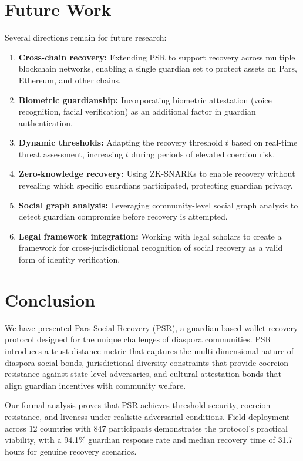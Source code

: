 \documentclass[11pt,a4paper,twocolumn]{article}
\begin{document}
\section{Future Work}\label{sec:future}

Several directions remain for future research:

\begin{enumerate}
  \item \textbf{Cross-chain recovery:} Extending PSR to support recovery across multiple blockchain networks, enabling a single guardian set to protect assets on Pars, Ethereum, and other chains.
  \item \textbf{Biometric guardianship:} Incorporating biometric attestation (voice recognition, facial verification) as an additional factor in guardian authentication.
  \item \textbf{Dynamic thresholds:} Adapting the recovery threshold $t$ based on real-time threat assessment, increasing $t$ during periods of elevated coercion risk.
  \item \textbf{Zero-knowledge recovery:} Using ZK-SNARKs to enable recovery without revealing which specific guardians participated, protecting guardian privacy.
  \item \textbf{Social graph analysis:} Leveraging community-level social graph analysis to detect guardian compromise before recovery is attempted.
  \item \textbf{Legal framework integration:} Working with legal scholars to create a framework for cross-jurisdictional recognition of social recovery as a valid form of identity verification.
\end{enumerate}

\section{Conclusion}\label{sec:conclusion}

We have presented Pars Social Recovery (PSR), a guardian-based wallet recovery protocol designed for the unique challenges of diaspora communities. PSR introduces a trust-distance metric that captures the multi-dimensional nature of diaspora social bonds, jurisdictional diversity constraints that provide coercion resistance against state-level adversaries, and cultural attestation bonds that align guardian incentives with community welfare.

Our formal analysis proves that PSR achieves threshold security, coercion resistance, and liveness under realistic adversarial conditions. Field deployment across 12 countries with 847 participants demonstrates the protocol's practical viability, with a 94.1\% guardian response rate and median recovery time of 31.7 hours for genuine recovery scenarios.
\end{document}
